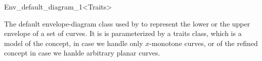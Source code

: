 
\ccRefPageBegin

\begin{ccRefClass}{Env_default_diagram_1<Traits>}

\ccDefinition

The default envelope-diagram class used by to represent the lower or the
upper envelope of a set of curves. It is is parameterized by a traits class,
which is a model of the  concept, in case
we handle only $x$-monotone curves, or of the refined 
concept in case we hanlde arbitrary planar curves.


\ccIsModel

\end{ccRefClass}

\ccRefPageEnd
